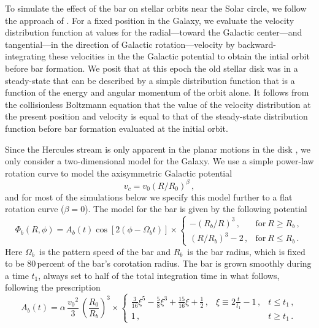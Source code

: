 \documentclass[12pt,preprint]{aastex}
\newcommand{\eg}{e.g.}
\newcommand{\vo}{\ensuremath{v_0}}
\newcommand{\Ro}{\ensuremath{R_0}}
\newcommand{\Ab}{\ensuremath{A_b}}
\newcommand{\Rb}{\ensuremath{R_b}}
\newcommand{\Omegab}{\ensuremath{\Omega_b}}
\begin{document}
To simulate the effect of the bar on stellar orbits near the Solar
circle, we follow the approach of \citet{dehnen00a}. For a fixed
position in the Galaxy, we evaluate the velocity distribution function
at values for the radial---toward the Galactic center---and
tangential---in the direction of Galactic rotation---velocity by
backward-integrating these velocities in the the Galactic potential to
obtain the intial orbit before bar formation. We posit that at this
epoch the old stellar disk was in a steady-state that can be described
by a simple distribution function that is a function of the energy and
angular momentum of the orbit alone. It follows from the collisionless
Boltzmann equation that the value of the velocity distribution at the
present position and velocity is equal to that of the steady-state
distribution function before bar formation evaluated at the initial
orbit.

Since the Hercules stream is only apparent in the planar motions in
the disk \citep[\eg][]{Bovy09a}, we only consider a two-dimensional
model for the Galaxy. We use a simple power-law rotation curve to
model the axisymmetric Galactic potential
\begin{equation}
v_c = \vo(R/\Ro)^\beta \,,
\end{equation}
and for most of the simulations below we specify this model further to
a flat rotation curve ($\beta = 0$). The model for the bar is given by
the following potential
\begin{equation}
\Phi_b(R,\phi) = \Ab(t) \cos [2(\phi - \Omegab t)] \times
\left\{ \begin{array}{ll} -(\Rb/R)^3\,, & \mathrm{for}\ R \geq
  \Rb\,,\\ (R/\Rb)^3-2\,, & \mathrm{for}\ R \leq \Rb\,. \end{array}
\right.
\end{equation}
Here \Omegab\ is the pattern speed of the bar and \Rb\ is the bar
radius, which is fixed to be 80\,percent of the bar's corotation
radius. The bar is grown smoothly during a time $t_1$, always set to
half of the total integration time in what follows, following the
prescription
\begin{equation}
\Ab(t) = \alpha \, \frac{\vo^2}{3}\,\left(\frac{\Ro}{\Rb}\right)^3
\times \left\{ \begin{array}{lll}
\frac{3}{16}\xi^5 - \frac{5}{8} \xi^3 + \frac{15}{16} \xi + \frac{1}{2}\,, & \xi \equiv 2\frac{t}{t_1}-1\,, & t \leq t_1\,,\\
1\,, & & t \geq t_1\,.\end{array} \right. 
\end{equation}
\end{document}
